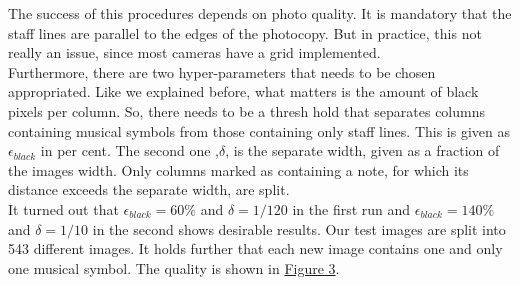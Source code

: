 \documentclass[twocolumn]{article}
\begin{document}
The success of this procedures depends on photo quality. It is mandatory that the staff lines are parallel to the edges of the photocopy. But in practice, this not really an issue, since most cameras have a grid implemented. \\
Furthermore, there are two hyper-parameters that needs to be chosen appropriated. Like we explained before, what matters is the amount of black pixels per column. So, there needs to be a thresh hold that separates columns containing musical symbols from those containing only staff lines. This is given as $\epsilon_{black}$ in per cent. The second one ,$\delta$, is the separate width, given as a fraction of the images width. Only columns marked as containing a note, for which its distance exceeds the separate width, are split. \\
It turned out that $\epsilon_{black} = 60\% $ and $\delta = 1/120$ in the first run and $\epsilon_{black} = 140\%$ and $\delta = 1/10$ in the second shows desirable results. Our test images are split into 543 different images. It holds further that each new image contains one and only one musical symbol. The quality is shown in \hyperref[quality]{Figure 3}.
\end{document}
